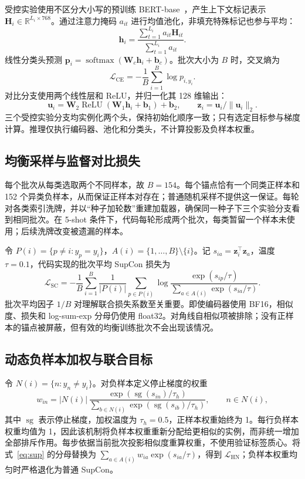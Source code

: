 \documentclass[runningheads]{llncs}
\begin{document}
受控实验使用不区分大小写的预训练 BERT-base~\cite{bert}，产生上下文标记表示 $\mathbf H_i\in\mathbb R^{L_i\times768}$。通过注意力掩码 $a_{it}$ 进行均值池化，非填充特殊标记也参与平均：
\begin{equation}
\mathbf h_i=\frac{\sum_{t=1}^{L_i}a_{it}\mathbf H_{it}}{\sum_{t=1}^{L_i}a_{it}}.
\label{eq:pool}
\end{equation}
线性分类头预测 $\mathbf p_i=\operatorname{softmax}(\mathbf W_c\mathbf h_i+\mathbf b_c)$。批次大小为 $B$ 时，交叉熵为
\begin{equation}
\mathcal L_{\mathrm{CE}}=-\frac1B\sum_{i=1}^B\log p_{i,y_i}.
\end{equation}
对比分支使用两个线性层和 ReLU，并归一化其 128 维输出：
\begin{equation}
\mathbf u_i=\mathbf W_2\operatorname{ReLU}(\mathbf W_1\mathbf h_i+\mathbf b_1)+\mathbf b_2,
\qquad\mathbf z_i=\mathbf u_i/\|\mathbf u_i\|_2.
\end{equation}
三个受控实验分支均实例化两个头，保持初始化顺序一致；只有选定目标参与梯度计算。推理仅执行编码器、池化和分类头，不计算投影及负样本权重。

\subsection{均衡采样与监督对比损失}
每个批次从每类选取两个不同样本，故 $B=154$。每个锚点恰有一个同类正样本和 152 个异类负样本，从而保证正样本对存在；普通随机采样不提供这一保证。每轮对各类索引洗牌，并以“种子加轮数”重建加载器，确保同一种子下三个实验分支看到相同批次。在 5-shot 条件下，代码每轮形成两个批次，每类暂留一个样本未使用；后续洗牌改变被遗漏的样本。

令 $P(i)=\{p\ne i:y_p=y_i\}$，$A(i)=\{1,\ldots,B\}\setminus\{i\}$。记 $s_{ia}=\mathbf z_i^\top\mathbf z_a$，温度 $\tau=0.1$，代码实现的批次平均 SupCon 损失为
\begin{equation}
\mathcal L_{\mathrm{SC}}=-\frac1B\sum_{i=1}^B\frac1{|P(i)|}\sum_{p\in P(i)}
\log\frac{\exp(s_{ip}/\tau)}{\sum_{a\in A(i)}\exp(s_{ia}/\tau)}.
\label{eq:sup}
\end{equation}
批次平均因子 $1/B$ 对理解联合损失系数至关重要。即使编码器使用 BF16，相似度、损失和 log-sum-exp 分母仍使用 float32。对角线自相似项被排除；没有正样本的锚点被屏蔽，但有效的均衡训练批次不会出现该情况。

\subsection{动态负样本加权与联合目标}
令 $N(i)=\{n:y_n\ne y_i\}$。对负样本定义停止梯度的权重
\begin{equation}
w_{in}=|N(i)|\,
\frac{\exp(\operatorname{sg}(s_{in})/\tau_h)}{\sum_{b\in N(i)}\exp(\operatorname{sg}(s_{ib})/\tau_h)},
\qquad n\in N(i),
\label{eq:weight}
\end{equation}
其中 $\operatorname{sg}$ 表示停止梯度，加权温度为 $\tau_h=0.5$，正样本权重始终为 1。每行负样本权重均值为 1，因此该机制将负样本权重重新分配给更相似的实例，而非统一增加全部排斥作用。每步依据当前批次投影相似度重算权重，不使用验证标签质心。将式~\ref{eq:sup} 的分母替换为 $\sum_{a\in A(i)}w_{ia}\exp(s_{ia}/\tau)$，得到 $\mathcal L_{\mathrm{HN}}$；负样本权重均匀时严格退化为普通 SupCon。
\end{document}
